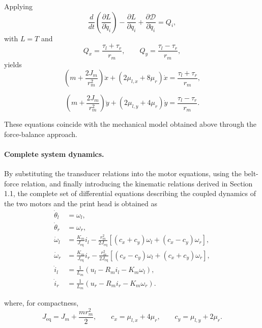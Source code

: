 \documentclass[11pt,a4paper]{article}
\begin{document}
Applying
\begin{equation}
\frac{d}{dt}
\left(
\frac{\partial L}{\partial \dot{q}_i}
\right)
-
\frac{\partial L}{\partial q_i}
+
\frac{\partial \mathcal{D}}{\partial \dot{q}_i}
=
Q_i,
\end{equation}
with $L=T$ and
\[
Q_x=\frac{\tau_l+\tau_r}{r_m},
\qquad
Q_y=\frac{\tau_l-\tau_r}{r_m},
\]
yields
\begin{equation}
\left(
m+\frac{2J_m}{r_m^2}
\right)\ddot{x}
+
\left(
2\mu_{l,x}+8\mu_r
\right)\dot{x}
=
\frac{\tau_l+\tau_r}{r_m},
\end{equation}

\begin{equation}
\left(
m+\frac{2J_m}{r_m^2}
\right)\ddot{y}
+
\left(
2\mu_{l,y}+4\mu_r
\right)\dot{y}
=
\frac{\tau_l-\tau_r}{r_m}.
\end{equation}

These equations coincide with the mechanical model obtained above through the force-balance approach.
\paragraph{Complete system dynamics.}
By substituting the transducer relations into the motor equations,
using the belt-force relation, and finally introducing the kinematic relations derived in Section 1.1,
the complete set of differential equations describing the coupled dynamics of the two motors and the print head is obtained as
\begin{equation}
\begin{aligned}
\dot{\theta}_l &= \omega_l,\\
\dot{\theta}_r &= \omega_r,\\
\dot{\omega}_l &=
\frac{K_m}{J_{\mathrm{eq}}}i_l
-
\frac{r_m^2}{2J_{\mathrm{eq}}}
\left[
(c_x+c_y)\omega_l
+
(c_x-c_y)\omega_r
\right],\\
\dot{\omega}_r &=
\frac{K_m}{J_{\mathrm{eq}}}i_r
-
\frac{r_m^2}{2J_{\mathrm{eq}}}
\left[
(c_x-c_y)\omega_l
+
(c_x+c_y)\omega_r
\right],\\
\dot{i}_l &=
\frac{1}{L_m}
\left(
u_l-R_m i_l-K_m\omega_l
\right),\\
\dot{i}_r &=
\frac{1}{L_m}
\left(
u_r-R_m i_r-K_m\omega_r
\right).
\end{aligned}
\end{equation}

where, for compactness,
\begin{equation}
J_{\mathrm{eq}} = J_m+\frac{mr_m^2}{2},
\qquad
c_x=\mu_{l,x}+4\mu_r,
\qquad
c_y=\mu_{l,y}+2\mu_r.
\end{equation}
\end{document}
